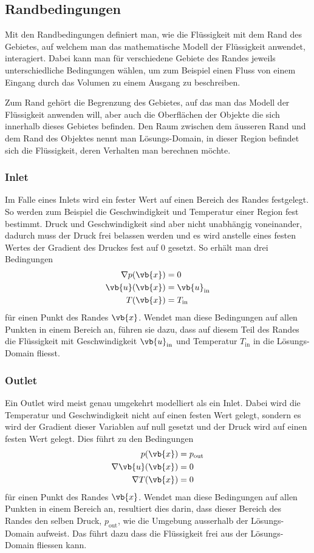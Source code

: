 \subsection{Randbedingungen}
\label{openfoam:randbedingungen}
Mit den Randbedingungen definiert man, wie die Flüssigkeit mit dem Rand des Gebietes, auf welchem man das mathematische Modell der Flüssigkeit anwendet, interagiert.
Dabei kann man für verschiedene Gebiete des Randes jeweils unterschiedliche Bedingungen wählen, um zum Beispiel einen Fluss von einem Eingang durch das Volumen zu einem Ausgang zu beschreiben.

Zum Rand gehört die Begrenzung des Gebietes, auf das man das Modell der Flüssigkeit anwenden will, aber auch die Oberflächen der Objekte die sich innerhalb dieses Gebietes befinden.
Den Raum zwischen dem äusseren Rand und dem Rand des Objektes nennt man Lösungs-Domain, in dieser Region befindet sich die Flüssigkeit, deren Verhalten man berechnen möchte.

\subsubsection{Inlet}
Im Falle eines Inlets wird ein fester Wert auf einen Bereich des Randes festgelegt. 
So werden zum Beispiel die Geschwindigkeit und Temperatur einer Region fest bestimmt.
Druck und Geschwindigkeit sind aber nicht unabhängig voneinander, dadurch muss der Druck frei belassen werden und es wird anstelle eines festen Wertes der Gradient des Druckes fest auf 0 gesetzt.
So erhält man drei Bedingungen 
\begin{align*}
 \nabla p(\vb{x}) &= 0 \\
 \vb{u}(\vb{x}) &= \vb{u}_{\text{in}} \\
 T(\vb{x}) &= T_{\text{in}}
\end{align*}
für einen Punkt des Randes $\vb{x}$.
Wendet man diese Bedingungen auf allen Punkten in einem Bereich an, führen sie dazu, dass auf diesem Teil des Randes die Flüssigkeit mit Geschwindigkeit $\vb{u}_{\text{in}}$ und Temperatur $T_{\text{in}}$ in die Lösungs-Domain fliesst.

\subsubsection{Outlet}
Ein Outlet wird meist genau umgekehrt modelliert als ein Inlet.
Dabei wird die Temperatur und Geschwindigkeit nicht auf einen festen Wert gelegt, sondern es wird der Gradient dieser Variablen auf null gesetzt und der Druck wird auf einen festen Wert gelegt.
Dies führt zu den Bedingungen
\begin{align*}
 p(\vb{x}) &= p_{\text{out}} \\
 \nabla\vb{u}(\vb{x}) &= 0 \\
 \nabla T(\vb{x}) &= 0
\end{align*}
für einen Punkt des Randes $\vb{x}$.
Wendet man diese Bedingungen auf allen Punkten in einem Bereich an, resultiert dies darin, dass dieser Bereich des Randes den selben Druck, $p_{\text{out}}$,  wie die Umgebung ausserhalb der Lösungs-Domain aufweist.
Das führt dazu dass die Flüssigkeit frei aus der Lösungs-Domain fliessen kann.

